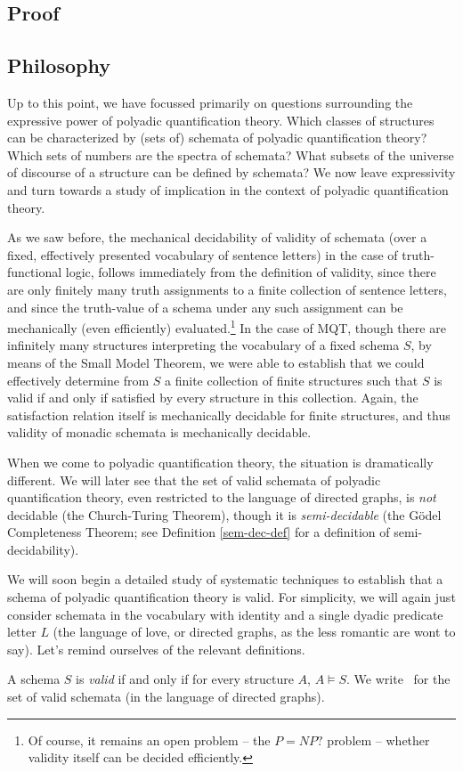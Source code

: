 \subsection{Proof}\label{pqt-proof-subsec}
\subsection*{Philosophy}
Up to this point, we have focussed primarily on questions surrounding the expressive power of polyadic quantification theory. Which classes of structures can be characterized by (sets of) schemata of polyadic quantification theory? Which sets of numbers are the spectra of schemata? What subsets of the universe of discourse of a structure can be defined by schemata? We now leave expressivity and turn towards a study of implication in the context of polyadic quantification theory. 

As we saw before, the mechanical decidability of validity of schemata (over a fixed, effectively presented vocabulary of sentence letters)
in the case of truth-functional logic, follows immediately from 
the definition of validity, since there are only finitely many truth assignments to a finite collection of sentence letters, and since the truth-value of a schema under any such assignment can be mechanically (even efficiently) evaluated.\footnote{Of course, it remains an open problem  -- the $P=NP?$ problem -- whether validity itself can be decided efficiently.} In the case of MQT, though there are infinitely many structures interpreting the vocabulary of a fixed schema $S$, by means of the Small Model Theorem, we were able to establish that we could effectively determine from $S$ a finite collection of finite structures such that $S$ is valid if and only if satisfied by every structure in this collection. Again, the satisfaction relation itself is mechanically decidable for finite structures, and thus validity of monadic schemata is mechanically decidable.

When we come to polyadic quantification theory, the situation is dramatically different. We will later see that the set of valid schemata of polyadic quantification theory, even restricted to the language of directed graphs, is \emph{not} decidable (the Church-Turing Theorem), though it is \emph{semi-decidable} (the G\"{o}del Completeness Theorem; see Definition \ref{sem-dec-def} for a definition of semi-decidability). 

We will soon begin a detailed study of systematic techniques to establish that a schema of polyadic quantification theory is valid. For simplicity, we will again just consider schemata in the vocabulary with identity and a single dyadic predicate letter $L$ (the language of love, or directed graphs, as the less romantic are wont to say). Let's remind ourselves of the relevant definitions.
\begin{definition}
A schema $S$ is \emph{valid} if and only if for every structure $A$, $A\models S$. We write \val\ for the set of valid schemata (in the language of directed graphs). 
\end{definition}

